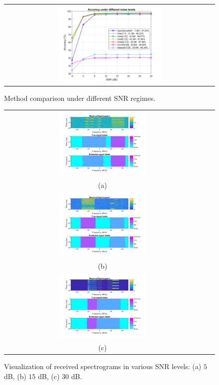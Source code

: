 \documentclass[conference]{IEEEtran} %
\begin{document}
\begin{figure}[!t]
    \centering
    \footnotesize
    \begin{tabular}{c}
        \includegraphics[width=0.5\textwidth]{img/accuracy_SNRs.jpg}
    \end{tabular}
    \caption{Method comparison under different SNR regimes.}
    \label{fig6}
\end{figure}

\begin{figure}[!ht]
    \centering
    \footnotesize
    \begin{tabular}{ccc}
        \includegraphics[width=0.45\textwidth]{img/Visualization_5dB.jpg} \\ (a)\\  \includegraphics[width=0.45\textwidth]{img/Visualization_15dB.jpg} \\ (b)\\ 
        \includegraphics[width=0.45\textwidth]{img/Visualization_30dB.jpg} \\ (c)\\ 
    \end{tabular}
    \caption{Visualization of received spectrograms in various SNR levels: (a) $5$ dB, (b) $15$ dB, (c) $30$ dB.}
    \label{fig7}
\end{figure}
\end{document}
